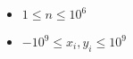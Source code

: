 \begin{itemize}
	\tightlist
    \item $1 \leq n \leq 10^6$
    \item $-10^9 \leq x_i,y_i \leq 10^9$
\end{itemize}


